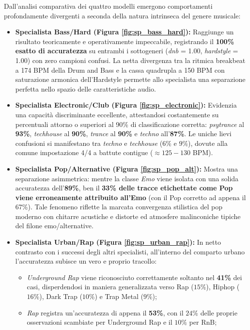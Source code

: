 Dall'analisi comparativa dei quattro modelli emergono comportamenti profondamente divergenti a seconda della natura intrinseca del genere musicale:
\begin{itemize}
    \item \textbf{Specialista Bass/Hard (Figura \ref{fig:sp_bass_hard}):} Raggiunge un risultato teoricamente e operativamente impeccabile, registrando il \textbf{100\% esatto di accuratezza} su entrambi i sottogeneri (\textit{dnb} = 1.00, \textit{hardstyle} = 1.00) con zero campioni confusi. La netta divergenza tra la ritmica breakbeat a 174 BPM della Drum and Bass e la cassa quadrupla a 150 BPM con saturazione armonica dell'Hardstyle permette allo specialista una separazione perfetta nello spazio delle caratteristiche audio.
    \item \textbf{Specialista Electronic/Club (Figura \ref{fig:sp_electronic}):} Evidenzia una capacità discriminante eccellente, attestandosi costantemente su percentuali attorno o superiori al 90\% di classificazione corretta: \textit{psytrance} al \textbf{93\%}, \textit{techhouse} al \textbf{90\%}, \textit{trance} al \textbf{90\%} e \textit{techno} all'\textbf{87\%}. Le uniche lievi confusioni si manifestano tra \textit{techno} e \textit{techhouse} ($6\%$ e $9\%$), dovute alla comune impostazione 4/4 a battute contigue ($\approx 125-130$ BPM).
    \item \textbf{Specialista Pop/Alternative (Figura \ref{fig:sp_pop_alt}):} Mostra una separazione asimmetrica: mentre la classe \textit{Emo} viene isolata con una solida accuratezza dell'\textbf{89\%}, ben il \textbf{33\% delle tracce etichettate come Pop viene erroneamente attribuito all'Emo} (con il Pop corretto ad appena il 67\%). Tale fenomeno riflette la marcata convergenza stilistica del pop moderno con chitarre acustiche e distorte ed atmosfere malinconiche tipiche del filone emo/alternative.
    \item \textbf{Specialista Urban/Rap (Figura \ref{fig:sp_urban_rap}):} In netto contrasto con i successi degli altri specialisti, all'interno del comparto urbano l'accuratezza subisce un vero e proprio tracollo:
    \begin{itemize}
        \item \textit{Underground Rap} viene riconosciuto correttamente soltanto nel \textbf{41\%} dei casi, disperdendosi in maniera generalizzata verso Rap ($15\%$), Hiphop ($16\%$), Dark Trap ($10\%$) e Trap Metal ($9\%$);
        \item \textit{Rap} registra un'accuratezza di appena il \textbf{53\%}, con il $24\%$ delle proprie osservazioni scambiate per Underground Rap e il $10\%$ per RnB;

\end{itemize}
\end{itemize}
